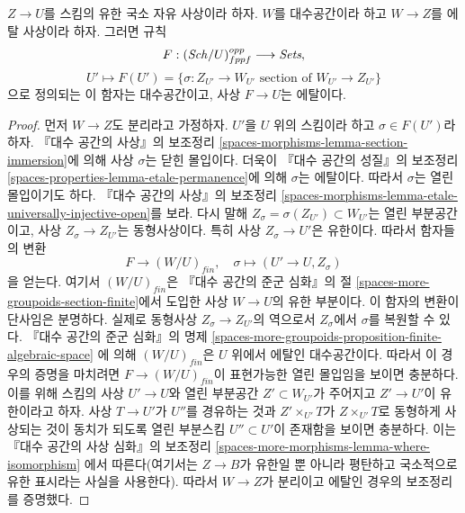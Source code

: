 \begin{lemma}
\label{lemma-space-of-sections}
$Z \to U$를 스킴의 유한 국소 자유 사상이라 하자.
$W$를 대수공간이라 하고 $W \to Z$를 에탈 사상이라 하자.
그러면 규칙
$$
F : (\mathit{Sch}/U)_{fppf}^{opp} \longrightarrow \textit{Sets},
$$
$$
U' \longmapsto
F(U') =
\{\sigma : Z_{U'} \to W_{U'}\text{ section of }W_{U'} \to Z_{U'}\}
$$
으로 정의되는 이 함자는 대수공간이고, 사상 $F \to U$는 에탈이다.
\end{lemma}

\begin{proof}
먼저 $W \to Z$도 분리라고 가정하자. $U'$을 $U$ 위의 스킴이라 하고
$\sigma \in F(U')$라 하자. 『대수 공간의 사상』의 보조정리
\ref{spaces-morphisms-lemma-section-immersion}에 의해
사상 $\sigma$는 닫힌 몰입이다. 더욱이 『대수 공간의 성질』의 보조정리
\ref{spaces-properties-lemma-etale-permanence}에 의해 $\sigma$는 에탈이다.
따라서 $\sigma$는 열린 몰입이기도 하다. 『대수 공간의 사상』의 보조정리
\ref{spaces-morphisms-lemma-etale-universally-injective-open}를 보라.
다시 말해 $Z_\sigma = \sigma(Z_{U'}) \subset W_{U'}$는 열린 부분공간이고,
사상 $Z_\sigma \to Z_{U'}$는 동형사상이다. 특히 사상
$Z_\sigma \to U'$은 유한이다. 따라서 함자들의 변환
$$
F \longrightarrow (W/U)_{fin}, \quad
\sigma \longmapsto (U' \to U, Z_\sigma)
$$
을 얻는다. 여기서 $(W/U)_{fin}$은 『대수 공간의 준군 심화』의 절
\ref{spaces-more-groupoids-section-finite}에서 도입한 사상
$W \to U$의 유한 부분이다. 이 함자의 변환이 단사임은 분명하다.
실제로 동형사상 $Z_\sigma \to Z_{U'}$의 역으로서
$Z_\sigma$에서 $\sigma$를 복원할 수 있다.
『대수 공간의 준군 심화』의 명제
\ref{spaces-more-groupoids-proposition-finite-algebraic-space}
에 의해 $(W/U)_{fin}$은 $U$ 위에서 에탈인 대수공간이다.
따라서 이 경우의 증명을 마치려면 $F \to (W/U)_{fin}$이
표현가능한 열린 몰입임을 보이면 충분하다. 이를 위해 스킴의 사상
$U' \to U$와 열린 부분공간 $Z' \subset W_{U'}$가 주어지고
$Z' \to U'$이 유한이라고 하자. 사상 $T \to U'$가 $U''$를
경유하는 것과 $Z' \times_{U'} T$가 $Z \times_{U'} T$로
동형하게 사상되는 것이 동치가 되도록 열린 부분스킴
$U'' \subset U'$이 존재함을 보이면 충분하다.
이는 『대수 공간의 사상 심화』의 보조정리
\ref{spaces-more-morphisms-lemma-where-isomorphism}
에서 따른다(여기서는 $Z \to B$가 유한일 뿐 아니라 평탄하고
국소적으로 유한 표시라는 사실을 사용한다).
따라서 $W \to Z$가 분리이고 에탈인 경우의 보조정리를 증명했다.


\end{proof}
